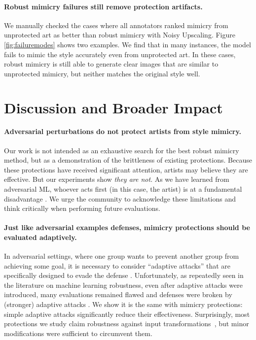 \documentclass{article}
\begin{document}
\paragraph{Robust mimicry failures still remove protection artifacts.} We manually checked the cases where all annotators ranked mimicry from unprotected art as better than robust mimicry with Noisy Upscaling. Figure \ref{fig:failuremodes} shows two examples. We find that in many instances, the model fails to mimic the style accurately even from unprotected art. In these cases, robust mimicry is still able to generate clear images that are similar to unprotected mimicry, but neither matches the original style well. 





\section{Discussion and Broader Impact}
\label{sec:discussion}

\paragraph{Adversarial perturbations do not protect artists from style mimicry.} 
Our work is not intended as an exhaustive search for the best robust mimicry method, but as a demonstration of the brittleness of existing protections. 
Because these protections have received significant attention, artists may believe they are effective.
But our experiments show \emph{they are not}.
As we have learned from adversarial ML, whoever acts first (in this case, the artist) is at a fundamental disadvantage \citep{radiya2021data}. 
We urge the community to acknowledge these limitations and think critically when performing future evaluations.

\paragraph{Just like adversarial examples defenses, mimicry protections should be evaluated adaptively.} 
In adversarial settings, where one group wants to prevent another group from achieving some goal, it is necessary to consider ``adaptive attacks'' that are specifically designed to evade the defense \citep{carlini2017adversarial}. 
Unfortunately, as repeatedly seen in the literature on machine learning robustness, even after adaptive attacks were introduced, many evaluations remained flawed and defenses were broken by (stronger) adaptive attacks \citep{tramer2020adaptive}.
We show it is the same with mimicry protections: simple adaptive attacks significantly reduce their effectiveness.
Surprisingly, most protections we study claim robustness against input transformations~\citep{mist,glaze}, but minor modifications were sufficient to circumvent them.
\end{document}
